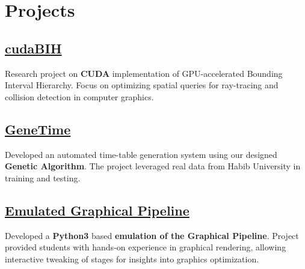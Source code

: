 \documentclass[]{resume}
\begin{document}
\begin{minipage}[t]{0.5\textwidth}


    \section{Projects}

    \subsection{\href{https://github.com/Qazalbash/cudaBIH}{\textbf{cudaBIH}}}
    Research project on \textbf{CUDA} implementation of GPU-accelerated Bounding Interval Hierarchy. Focus on optimizing spatial queries for ray-tracing and collision detection in computer graphics.

    \subsection{\href{https://github.com/Qazalbash/GeneTime}{\textbf{GeneTime}}}
    Developed an automated time-table generation system using our designed \textbf{Genetic Algorithm}. The project leveraged real data from Habib University in training and testing.


    \subsection{\href{https://github.com/Qazalbash/Emulated-Graphical-Pipeline}{
            \textbf{Emulated Graphical Pipeline}}}%
    Developed a \textbf{Python3} based \textbf{emulation of the Graphical Pipeline}. Project provided students with hands-on experience in graphical rendering, allowing interactive tweaking of stages for insights into graphics optimization.


\end{minipage}
\end{document}
